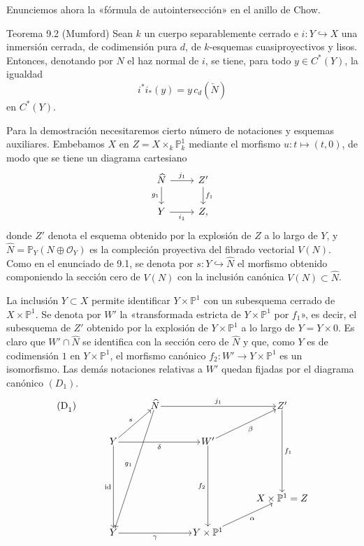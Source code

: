 Enunciemos ahora la «fórmula de autointersección» en el anillo de Chow.

\begin{statement}{Teorema 9.2 (Mumford)}
Sean $k$ un cuerpo separablemente cerrado e $i:Y\hookrightarrow X$ una inmersión cerrada, de codimensión pura $d$, de $k$-esquemas cuasiproyectivos y lisos. Entonces, denotando por $N$ el haz normal de $i$, se tiene, para todo $y\in C^*(Y)$, la igualdad
\[
i^*i_*(y)=y\,c_d(\check N)
\]
en $C^*(Y)$.
\end{statement}

Para la demostración necesitaremos cierto número de notaciones y esquemas auxiliares. Embebamos $X$ en $Z=X\times_k\mathbb P^1_k$ mediante el morfismo $u:t\mapsto(t,0)$, de modo que se tiene un diagrama cartesiano
\[
\begin{tikzcd}
\widehat N \arrow[r,"j_1"] \arrow[d,"g_1"'] & Z' \arrow[d,"f_1"]\\
Y \arrow[r,"i_1"'] & Z ,
\end{tikzcd}
\]
donde $Z'$ denota el esquema obtenido por la explosión de $Z$ a lo largo de $Y$, y $\widehat N=\mathbb P_Y(N\oplus\mathcal O_Y)$ es la compleción proyectiva del fibrado vectorial $V(N)$. Como en el enunciado de 9.1, se denota por $s:Y\hookrightarrow\widehat N$ el morfismo obtenido componiendo la sección cero de $V(N)$ con la inclusión canónica $V(N)\subset\widehat N$.

La inclusión $Y\subset X$ permite identificar $Y\times\mathbb P^1$ con un subesquema cerrado de $X\times\mathbb P^1$. Se denota por $W'$ la «transformada estricta de $Y\times\mathbb P^1$ por $f_1$», es decir, el subesquema de $Z'$ obtenido por la explosión de $Y\times\mathbb P^1$ a lo largo de $Y=Y\times0$. Es claro que $W'\cap\widehat N$ se identifica con la sección cero de $\widehat N$ y que, como $Y$ es de codimensión $1$ en $Y\times\mathbb P^1$, el morfismo canónico $f_2:W'\to Y\times\mathbb P^1$ es un isomorfismo. Las demás notaciones relativas a $W'$ quedan fijadas por el diagrama canónico $(D_1)$.
\[
\begin{tikzcd}[column sep=3.2em,row sep=2.4em,cells={nodes={inner sep=1pt}}]
\text{(D}_1\text{)}\arrow[from=1-3,to=5-2,"g_1"']
& & \widehat N \arrow[rr,"j_1"] & & Z' \arrow[ddd,"f_1"] \\
& Y \arrow[ur,"s"] \arrow[rr,"\delta"'] \arrow[ddd,"\mathrm{id}"'] & &
W' \arrow[ur,"\beta"'] \arrow[ddd,"f_2"'] & \\
& & & & \\
& & & & X\times\mathbb P^1=Z \\
& Y \arrow[rr,"\gamma"'] & & Y\times\mathbb P^1 \arrow[ur,"\alpha"'] &
\end{tikzcd}
\]

